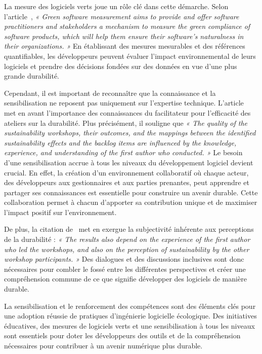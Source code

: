 La mesure des logiciels verts joue un rôle clé dans cette démarche. Selon l'article~\cite{GreenMeasurementStructure}, \emph{« Green software measurement aims to provide and offer software practitioners and stakeholders a mechanism to measure the green compliance of software products, which will help them ensure their software's naturalness in their organizations. »} En établissant des mesures mesurables et des références quantifiables, les développeurs peuvent évaluer l'impact environnemental de leurs logiciels et prendre des décisions fondées sur des données en vue d'une plus grande durabilité.


Cependant, il est important de reconnaître que la connaissance et la sensibilisation ne reposent pas uniquement sur l'expertise technique. L'article~\cite{SustainabilityAwarenessFramework} met en avant l'importance des connaissances du facilitateur pour l'efficacité des ateliers sur la durabilité. Plus précisément, il souligne que \emph{« The quality of the sustainability workshops, their outcomes, and the mappings between the identified sustainability effects and the backlog items are influenced by the knowledge, experience, and understanding of the first author who conducted. »} Le besoin d'une sensibilisation accrue à tous les niveaux du développement logiciel devient crucial. En effet, la création d'un environnement collaboratif où chaque acteur, des développeurs aux gestionnaires et aux parties prenantes, peut apprendre et partager ses connaissances est essentielle pour construire un avenir durable. Cette collaboration permet à chacun d'apporter sa contribution unique et de maximiser l'impact positif sur l'environnement.


De plus, la citation de~\cite{SustainabilityAwarenessFramework} met en exergue la subjectivité inhérente aux perceptions de la durabilité : \emph{« The results also depend on the experience of the first author who led the workshops, and also on the perception of sustainability by the other workshop participants. »} Des dialogues et des discussions inclusives sont donc nécessaires pour combler le fossé entre les différentes perspectives et créer une compréhension commune de ce que signifie développer des logiciels de manière durable.


La sensibilisation et le renforcement des compétences sont des éléments clés pour une adoption réussie de pratiques d'ingénierie logicielle écologique. Des initiatives éducatives, des mesures de logiciels verts et une sensibilisation à tous les niveaux sont essentiels pour doter les développeurs des outils et de la compréhension nécessaires pour contribuer à un avenir numérique plus durable.

